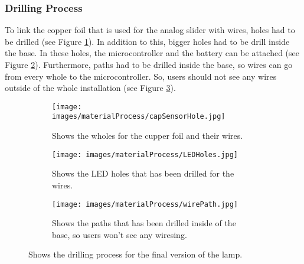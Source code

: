\documentclass[04.3_buildingProcess.tex]{subfiles}
\begin{document}
    \subsubsection{Drilling Process}
    \begin{flushleft}
        \noindent
        To link the copper foil that is used for the analog slider with wires, holes had to be drilled
        (see Figure \ref{fig:capSensorHole}). In addition to 
        this, bigger holes had to be drill inside the base. In these holes, the microcontroller and the battery 
        can be attached (see Figure \ref{fig:LEDHoles}). Furthermore, paths had to be drilled 
        inside the base, so wires can go from every whole to the microcontroller. So, users 
        should not see any wires outside of the whole installation (see Figure \ref{fig:wirePath}).

        \begin{figure}[H]
            \centering
            \begin{subfigure}{.45\textwidth}
            \centering
            \texttt{[image: images/materialProcess/capSensorHole.jpg]}
            \caption{Shows the wholes for the cupper foil and their wires.}
            \label{fig:capSensorHole}
            \vspace{6mm}
            \end{subfigure}
            \medskip
            \hspace{1mm}
            \begin{subfigure}{.45\textwidth}
                \centering
                \texttt{[image: images/materialProcess/LEDHoles.jpg]}
                \caption{Shows the LED holes that has been drilled for the wires.}
                \label{fig:LEDHoles}
                \vspace{6mm}
            \end{subfigure}
            \hspace{1mm}
            \begin{subfigure}{.45\textwidth}
                \centering
                \texttt{[image: images/materialProcess/wirePath.jpg]}
                \caption{Shows the paths that has been drilled inside of the base, so 
                users won't see any wiresing.}
                \label{fig:wirePath}
                \vspace{6mm}
            \end{subfigure}
            \caption{Shows the drilling process for the final version of the lamp.}
            \label{fig:drillingProcess}
        \end{figure}
    \end{flushleft}
\end{document}
